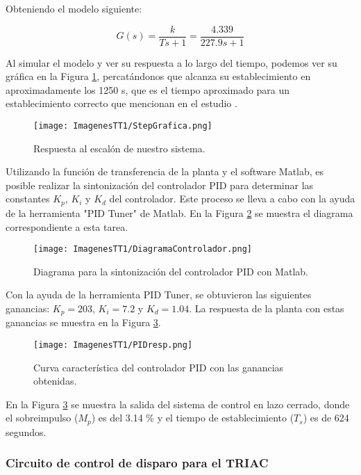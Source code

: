 \documentclass[14pt,oneside]{extarticle} %
\begin{document}
Obteniendo el modelo siguiente:

\[
G(s) = \frac{k}{Ts + 1} = \frac{4.339}{227.9s + 1}
\]

\newpage

Al simular el modelo y ver su respuesta a lo largo del tiempo, podemos ver su gráfica en la Figura \ref{fig:step}, percatándonos que alcanza su establecimiento en aproximadamente los 1250 s, que es el tiempo aproximado para un establecimiento correcto que mencionan en el estudio \cite{rosales2020}.

\begin{figure}[h!]
    \centering
    \texttt{[image: ImagenesTT1/StepGrafica.png]}
    \caption{Respuesta al escalón de nuestro sistema.}
    \label{fig:step}
\end{figure}


Utilizando la función de transferencia de la planta y el software Matlab, es posible realizar la sintonización del controlador PID para determinar las constantes \(K_p\), \(K_i\) y \(K_d\) del controlador. Este proceso se lleva a cabo con la ayuda de la herramienta "PID Tuner" de Matlab. En la Figura \ref{fig:pid_tuner} se muestra el diagrama correspondiente a esta tarea.

\begin{figure}[h!]
    \centering
    \texttt{[image: ImagenesTT1/DiagramaControlador.png]}
    \caption{Diagrama para la sintonización del controlador PID con Matlab.}
    \label{fig:pid_tuner}
\end{figure}

\newpage
Con la ayuda de la herramienta PID Tuner, se obtuvieron las siguientes ganancias: \(K_p = 203\), \(K_i = 7.2\) y \(K_d = 1.04\). La respuesta de la planta con estas ganancias se muestra en la Figura \ref{fig:pid_response}.

\begin{figure}[h!]
    \centering
    \texttt{[image: ImagenesTT1/PIDresp.png]}
    \caption{Curva característica del controlador PID con las ganancias obtenidas.}
    \label{fig:pid_response}
\end{figure}

En la Figura \ref{fig:pid_response} se muestra la salida del sistema de control en lazo cerrado, donde el sobreimpulso (\(M_p\)) es del 3.14 \% y el tiempo de establecimiento (\(T_s\)) es de 624 segundos. 

\subsubsection{Circuito de control de disparo para el TRIAC}
\end{document}
